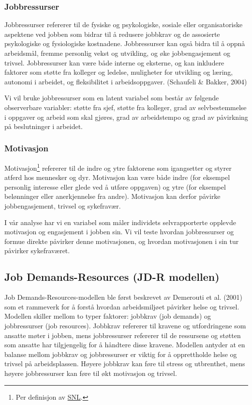 \documentclass[
  12pt,
  a4paper,
  DIV=11,
  numbers=noendperiod]{scrartcl}
\begin{document}
\subsubsection{Jobbressurser}\label{jobbressurser}

Jobbressurser refererer til de fysiske og psykologiske, sosiale eller
organisatoriske aspektene ved jobben som bidrar til å redusere jobbkrav
og de assosierte psykologiske og fysiologiske kostnadene. Jobbressurser
kan også bidra til å oppnå arbeidsmål, fremme personlig vekst og
utvikling, og øke jobbengasjement og trivsel. Jobbressurser kan være
både interne og eksterne, og kan inkludere faktorer som støtte fra
kolleger og ledelse, muligheter for utvikling og læring, autonomi i
arbeidet, og fleksibilitet i arbeidsoppgaver. (Schaufeli \& Bakker,
2004)

Vi vil bruke jobbressurser som en latent variabel som består av følgende
observerbare variabler: støtte fra sjef, støtte fra kolleger, grad av
selvbestemmelse i oppgaver og arbeid som skal gjøres, grad av
arbeidstempo og grad av påvirkning på beslutninger i arbeidet.

\subsubsection{Motivasjon}\label{motivasjon}

Motivasjon\footnote{Per definisjon av
  \href{https://snl.no/motivasjon\#:~:text=Motivasjon\%20er\%20en\%20samlebetegnelse\%20for,motiveres\%20til\%20\%C3\%A5\%20oppn\%C3\%A5\%20dette}{SNL}.}
refererer til de indre og ytre faktorene som igangsetter og styrer
atferd hos mennesker og dyr. Motivasjon kan være både indre (for
eksempel personlig interesse eller glede ved å utføre oppgaven) og ytre
(for eksempel belønninger eller anerkjennelse fra andre). Motivasjon kan
derfor påvirke jobbengasjement, trivsel og sykefravær.

I vår analyse har vi en variabel som måler individets selvrapporterte
opplevde motivasjon og engasjement i jobben sin. Vi vil teste hvordan
jobbressurser og formue direkte påvirker denne motivasjonen, og hvordan
motivasjonen i sin tur påvirker sykefraværet.

\subsection{Job Demands-Resources (JD-R
modellen)}\label{job-demands-resources-jd-r-modellen}

Job Demands-Resources-modellen ble først beskrevet av Demerouti et al.
(2001) som et rammeverk for å forstå hvordan arbeidsmiljøet påvirker
helse og trivsel. Modellen skiller mellom to typer faktorer: jobbkrav
(job demands) og jobbressurser (job resources). Jobbkrav refererer til
kravene og utfordringene som ansatte møter i jobben, mens jobbressurser
refererer til de ressursene og støtten som ansatte har tilgjengelig for
å håndtere disse kravene. Modellen antyder at en balanse mellom jobbkrav
og jobbressurser er viktig for å opprettholde helse og trivsel på
arbeidsplassen. Høyere jobbkrav kan føre til stress og utbrenthet, mens
høyere jobbressurser kan føre til økt motivasjon og trivsel.
\end{document}
